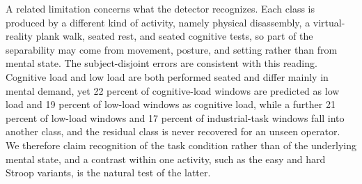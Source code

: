 \documentclass[a4paper,twoside]{article}
\begin{document}
A related limitation concerns what the detector recognizes. Each class is produced by a different kind of activity, namely physical disassembly, a virtual-reality plank walk, seated rest, and seated cognitive tests, so part of the separability may come from movement, posture, and setting rather than from mental state. The subject-disjoint errors are consistent with this reading. Cognitive load and low load are both performed seated and differ mainly in mental demand, yet 22 percent of cognitive-load windows are predicted as low load and 19 percent of low-load windows as cognitive load, while a further 21 percent of low-load windows and 17 percent of industrial-task windows fall into another class, and the residual class is never recovered for an unseen operator. We therefore claim recognition of the task condition rather than of the underlying mental state, and a contrast within one activity, such as the easy and hard Stroop variants, is the natural test of the latter.



\end{document}
